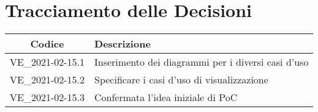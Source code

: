 \section*{Tracciamento delle Decisioni}

\begin{center}
	\begin{longtable}{|c|p{11.5cm}|}
	\hline
	\rowcolor{lighter-grayer}
	\textbf{Codice} & \textbf{Descrizione} \\
	\hline
	\endfirsthead

	\hline
	VE\_2021-02-15.1 & Inserimento dei diagrammi per i diversi casi d'uso \\
	VE\_2021-02-15.2 & Specificare i casi d'uso di visualizzazione \\
	VE\_2021-02-15.3 & Confermata l'idea iniziale di PoC \\
	\hline

	\end{longtable}
\end{center}